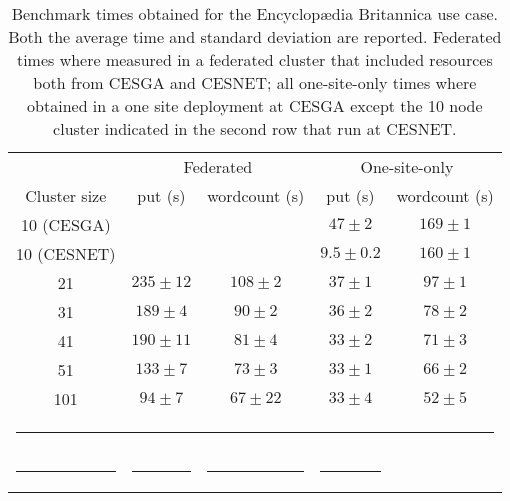 \begin{table}[h!]
\caption{Benchmark times obtained for the Encyclop{\ae}dia Britannica use case. Both the average time and standard deviation are reported. Federated times where measured in a federated cluster that included resources both from CESGA and CESNET; all one-site-only times where obtained in a one site deployment at CESGA except the 10 node cluster indicated in the second row that run at CESNET. }
\label{table:britannica}
%
\vspace{-0.5em}
%
\begin{center}
\begin{tabular}{ccccc}
\toprule
					& \multicolumn{2}{c}{Federated} 		& \multicolumn{2}{c}{One-site-only} \\
Cluster size				& put (s)		& wordcount (s) 	& put (s)		& wordcount (s)\\
\midrule
10 (CESGA)             			&        		&               	& $47\pm2$		& $169\pm1$\\
10 (CESNET)          			& 			&  			& $9.5\pm0.2$		& $160\pm1$\\
21                   			& $235\pm12$		& $108\pm2$     	& $37\pm1$		& $97\pm1$\\
31                   			& $189\pm4$		& $90\pm2$      	& $36\pm2$		& $78\pm2$\\
41                   			& $190\pm11$		& $81\pm4$      	& $33\pm2$		& $71\pm3$\\
51                   			& $133\pm7$		& $73\pm3$      	& $33\pm1$		& $66\pm2$\\
101                  			& $94\pm7$		& $67\pm22$      	& $33\pm4$		& $52\pm5$\\
%
\bottomrule
\multicolumn{5}{c}{\rule{0.98\textwidth}{0em}}\\
\rule{0.2\textwidth}{0cm} & \rule{0.2\textwidth}{0cm} & \rule{0.2\textwidth}{0cm} &  \rule{0.2\textwidth}{0cm} & \\
\end{tabular}
\end{center}
\end{table}



